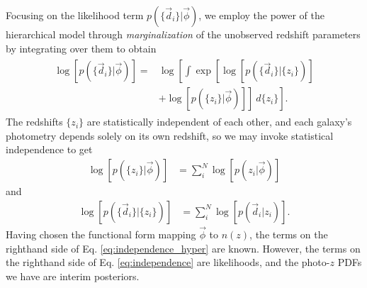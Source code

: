 \documentclass[iop]{emulateapj}
\begin{document}
Focusing on the likelihood term $p(\{\vec{d}_{i}\} | \vec{\phi})$, we employ 
the power of the hierarchical model through \textit{marginalization} of the 
unobserved redshift parameters by integrating over them to obtain 
\begin{align}
\label{eq:marginalize}
\begin{split}
\log[p(\{\vec{d}_{i}\} | \vec{\phi})] = & 
\log\left[\int\exp\left[\log[p(\{\vec{d}_{i}\} | \{z_{i}\})]\right.\right. \\
& \left.\left.+ \log[p(\{z_{i}\} | \vec{\phi})]\right]\ d\{z_{i}\}\right] .
\end{split}
\end{align}
The redshifts $\{z_{i}\}$ are statistically independent of each other, and each 
galaxy's photometry depends solely on its own redshift, so we may invoke 
statistical independence to get
\begin{align}
\label{eq:independence_hyper}
\log[p(\{z_{i}\} | \vec{\phi})] &= \sum_{i}^{N} \log[p(z_{i} | \vec{\phi})]
\end{align}
and
\begin{align}
\label{eq:independence}
\log[p(\{\vec{d}_{i}\} | \{z_{i}\})] &= \sum_{i}^{N} \log[p(\vec{d}_{i} | 
z_{i})] .
\end{align}
Having chosen the functional form mapping $\vec{\phi}$ to $n(z)$, the terms on 
the righthand side of Eq. \ref{eq:independence_hyper} are known.  However, the 
terms on the righthand side of Eq. \ref{eq:independence} are likelihoods, and 
the photo-$z$ PDFs we have are interim posteriors.
\end{document}
